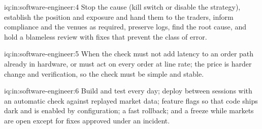 \begin{solution}{iq:in:software-engineer:4}
Stop the cause (kill switch or disable the strategy), establish the position and exposure and hand them to the traders,
inform compliance and the venues as required, preserve logs, find the root cause, and hold a blameless review with
fixes that prevent the class of error.
\end{solution}

\begin{solution}{iq:in:software-engineer:5}
When the check must not add latency to an order path already in hardware, or must act on every order at line rate; the
price is harder change and verification, so the check must be simple and stable.
\end{solution}

\begin{solution}{iq:in:software-engineer:6}
Build and test every day; deploy between sessions with an automatic check against replayed market data; feature flags so
that code ships dark and is enabled by configuration; a fast rollback; and a freeze while markets are open except for
fixes approved under an incident.
\end{solution}
